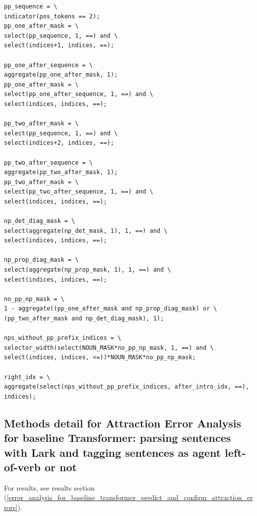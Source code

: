 \documentclass[11pt]{article}
\begin{document}
\begin{tiny}
\begin{verbatim}
pp_sequence = \
indicator(pos_tokens == 2);
pp_one_after_mask = \
select(pp_sequence, 1, ==) and \
select(indices+1, indices, ==);

pp_one_after_sequence = \
aggregate(pp_one_after_mask, 1);
pp_one_after_mask = \
select(pp_one_after_sequence, 1, ==) and \
select(indices, indices, ==);

pp_two_after_mask = \
select(pp_sequence, 1, ==) and \
select(indices+2, indices, ==);

pp_two_after_sequence = \
aggregate(pp_two_after_mask, 1);
pp_two_after_mask = \
select(pp_two_after_sequence, 1, ==) and \
select(indices, indices, ==);

np_det_diag_mask = \
select(aggregate(np_det_mask, 1), 1, ==) and \
select(indices, indices, ==);

np_prop_diag_mask = \
select(aggregate(np_prop_mask, 1), 1, ==) and \
select(indices, indices, ==);

no_pp_np_mask = \
1 - aggregate((pp_one_after_mask and np_prop_diag_mask) or \
(pp_two_after_mask and np_det_diag_mask), 1);

nps_without_pp_prefix_indices = \
selector_width(select(NOUN_MASK*no_pp_np_mask, 1, ==) and \
select(indices, indices, <=))*NOUN_MASK*no_pp_np_mask;

right_idx = \
aggregate(select(nps_without_pp_prefix_indices, after_intro_idx, ==), indices); 
\end{verbatim}
\end{tiny}

\clearpage
\subsection{Methods detail for Attraction Error Analysis for \citep{Wu2023} baseline Transformer: parsing sentences with Lark and tagging sentences as agent left-of-verb or not  }
\label{appendix_error_analysis_for_baseline_transformer_methods}

For results, see results section (\ref{error_analysis_for_baseline_transformer_predict_and_confirm_attraction_errors}).
\end{document}
